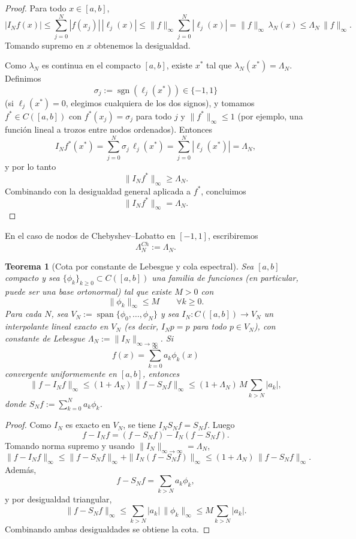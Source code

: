 \documentclass[a4paper,11pt]{report}
\newtheorem{theorem}{Teorema}[chapter]
\begin{document}
\begin{proof}
Para todo $x\in[a,b]$,
\[
|I_Nf(x)|
\le \sum_{j=0}^N |f(x_j)|\,|\ell_j(x)|
\le \|f\|_\infty\sum_{j=0}^N|\ell_j(x)|
=\|f\|_\infty\,\lambda_N(x)
\le \Lambda_N\,\|f\|_\infty.
\]
Tomando supremo en $x$ obtenemos la desigualdad.

Como $\lambda_N$ es continua en el compacto $[a,b]$, existe $x^\ast$ tal que $\lambda_N(x^\ast)=\Lambda_N$. Definimos
\[
\sigma_j:=\operatorname{sgn}(\ell_j(x^\ast))\in\{-1,1\}
\]
(si $\ell_j(x^\ast)=0$, elegimos cualquiera de los dos signos), y tomamos $f^\ast\in C([a,b])$ con $f^\ast(x_j)=\sigma_j$ para todo $j$ y $\|f^\ast\|_\infty\le1$ (por ejemplo, una función lineal a trozos entre nodos ordenados).
Entonces
\[
I_Nf^\ast(x^\ast)
=\sum_{j=0}^N \sigma_j\,\ell_j(x^\ast)
=\sum_{j=0}^N |\ell_j(x^\ast)|
=\Lambda_N,
\]
y por lo tanto
\[
\|I_Nf^\ast\|_\infty\ge\Lambda_N.
\]
Combinando con la desigualdad general aplicada a $f^\ast$, concluimos
\[
\|I_Nf^\ast\|_\infty=\Lambda_N.
\]
\end{proof}

En el caso de nodos de Chebyshev--Lobatto en $[-1,1]$, escribiremos
\[
\Lambda_N^{Ch}:=\Lambda_N.
\]

\begin{theorem}[Cota por constante de Lebesgue y cola espectral]\label{thm:cota_universal_lebesgue_cola}
Sea $[a,b]$ compacto y sea $\{\phi_k\}_{k\ge0}\subset C([a,b])$ una familia de funciones (en particular, puede ser una base ortonormal) tal que existe $M>0$ con
\[
\|\phi_k\|_\infty\le M\qquad\forall k\ge0.
\]
Para cada $N$, sea $V_N:=\operatorname{span}\{\phi_0,\dots,\phi_N\}$ y sea $I_N:C([a,b])\to V_N$ un interpolante lineal exacto en $V_N$ (es decir, $I_Np=p$ para todo $p\in V_N$), con constante de Lebesgue $\Lambda_N:=\|I_N\|_{\infty\to\infty}$. Si
\[
f(x)=\sum_{k=0}^{\infty}a_k\phi_k(x)
\]
convergente uniformemente en $[a,b]$, entonces
\[
\|f-I_Nf\|_\infty
\le (1+\Lambda_N)\,\|f-S_Nf\|_\infty
\le (1+\Lambda_N)\,M\sum_{k>N}|a_k|,
\]
donde $S_Nf:=\sum_{k=0}^{N}a_k\phi_k$.
\end{theorem}

\begin{proof}
Como $I_N$ es exacto en $V_N$, se tiene $I_NS_Nf=S_Nf$. Luego
\[
f-I_Nf=(f-S_Nf)-I_N(f-S_Nf).
\]
Tomando norma supremo y usando $\|I_N\|_{\infty\to\infty}=\Lambda_N$,
\[
\|f-I_Nf\|_\infty
\le \|f-S_Nf\|_\infty+\|I_N(f-S_Nf)\|_\infty
\le (1+\Lambda_N)\,\|f-S_Nf\|_\infty.
\]
Además,
\[
f-S_Nf=\sum_{k>N}a_k\phi_k,
\]
y por desigualdad triangular,
\[
\|f-S_Nf\|_\infty
\le \sum_{k>N}|a_k|\,\|\phi_k\|_\infty
\le M\sum_{k>N}|a_k|.
\]
Combinando ambas desigualdades se obtiene la cota.
\end{proof}
\end{document}
